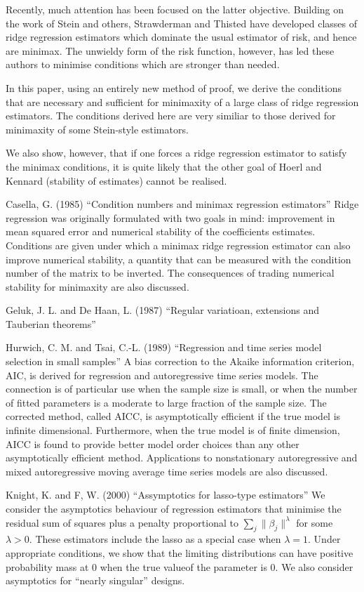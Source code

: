 \documentclass{amsart}[12pt]
\begin{document}
Recently, much attention has been focused on the latter objective. Building on the work of Stein and others,
Strawderman and Thisted have developed classes of ridge regression estimators which dominate the usual estimator
of risk, and hence are minimax. The unwieldy form of the risk function, however, has led these authors to
minimise conditions which are stronger than needed.

In this paper, using an entirely new method of proof, we derive the conditions that are necessary and sufficient
for minimaxity of a large class of ridge regression estimators. The conditions derived here are very similiar
to those derived for minimaxity of some Stein-style estimators.

We also show, however, that if one forces a ridge regression estimator to satisfy the minimax conditions, it is
quite likely that the other goal of Hoerl and Kennard (stability of estimates) cannot be realised.

Casella, G. (1985) ``Condition numbers and minimax regression estimators''
Ridge regression was originally formulated with two goals in mind: improvement in mean squared error and numerical
stability of the coefficients estimates. Conditions are given under which a minimax ridge regression estimator
can also improve numerical stability, a quantity that can be measured with the condition number of the matrix
to be inverted. The consequences of trading numerical stability for minimaxity are also discussed.

Geluk, J. L. and De Haan, L. (1987) ``Regular variatioan, extensions and Tauberian theorems''

Hurwich, C. M. and Tsai, C.-L. (1989) ``Regression and time series model selection in small samples''
A bias correction to the Akaike information criterion, AIC, is derived for regression and autoregressive time
series models. The connection is of particular use when the sample size is small, or when the number of fitted
parameters is a moderate to large fraction of the sample size. The corrected method, called AICC, is 
asymptotically efficient if the true model is infinite dimensional. Furthermore, when the true model is of
finite dimension, AICC is found to provide better model order choices than any other asymptotically efficient
method. Applications to nonstationary autoregressive and mixed autoregressive moving average time series models
are also discussed.

Knight, K. and F, W. (2000) ``Assymptotics for lasso-type estimators''
We consider the asymptotics behaviour of regression estimators that minimise the residual sum of squares plus
a penalty proportional to $\sum_j \|\beta_j\|^\lambda$ for some $\lambda > 0$. These estimators include
the lasso as a special case when $\lambda = 1$. Under appropriate conditions, we show that the limiting 
distributions can have positive probability mass at $0$ when the true valueof the parameter is $0$. We also 
consider asymptotics for ``nearly singular'' designs.
\end{document}

